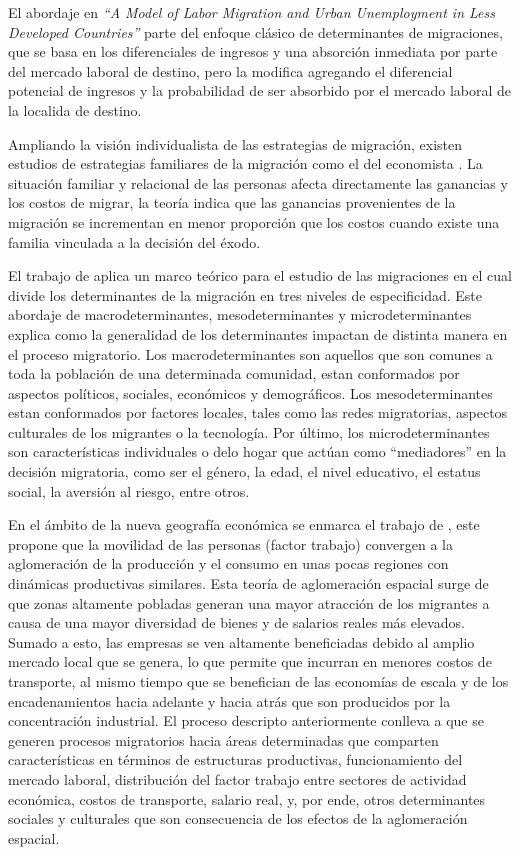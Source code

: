 \documentclass[12pt,a4paper]{article}
\begin{document}
El abordaje en \textit{``A Model of Labor Migration and Urban Unemployment in Less Developed Countries''} \parencite{todaro_model_1969} parte del enfoque clásico de determinantes de migraciones, que se basa en los diferenciales de ingresos y una absorción inmediata por parte del mercado laboral de destino, pero la modifica agregando el diferencial potencial de ingresos y la probabilidad de ser absorbido por el mercado laboral de la localida de destino. 

Ampliando la visión individualista de las estrategias de migración, existen estudios de estrategias familiares de la migración como el del economista \textcite{mincer_family_1978}. La situación familiar y relacional de las personas afecta directamente las ganancias y los costos de migrar, la teoría indica que las ganancias provenientes de la migración se incrementan en menor proporción que los costos cuando existe una familia vinculada a la decisión del éxodo. 

El trabajo de \textcite{kuhnt_literature_2019} aplica un marco teórico para el estudio de las migraciones en el cual divide los determinantes de la migración en tres niveles de especificidad. Este abordaje de macrodeterminantes, mesodeterminantes y microdeterminantes explica como la generalidad de los determinantes impactan de distinta manera en el proceso migratorio. Los macrodeterminantes son aquellos que son comunes a toda la población de una determinada comunidad, estan conformados por aspectos políticos, sociales, económicos y demográficos. Los mesodeterminantes estan conformados por factores locales, tales como las redes migratorias, aspectos culturales de los migrantes o la tecnología. Por último, los microdeterminantes son características individuales o delo hogar que actúan como ``mediadores'' en la decisión migratoria, como ser el género, la edad, el nivel educativo, el estatus social, la aversión al riesgo, entre otros. 

En el ámbito de la nueva geografía económica se enmarca el trabajo de \textcite{krugman_increasing_1991}, este  propone que la movilidad de las personas (factor trabajo) convergen a la aglomeración de la producción y el consumo en unas pocas regiones con dinámicas productivas similares. Esta teoría de aglomeración espacial surge de que  zonas altamente pobladas generan una mayor atracción de los migrantes a causa de una mayor diversidad de bienes y de salarios reales más elevados. Sumado a esto, las empresas se ven altamente beneficiadas debido al amplio mercado local que se genera, lo que permite que incurran en menores costos de transporte, al mismo tiempo que se benefician de las economías de escala y de los encadenamientos hacia adelante y hacia atrás que son producidos por la concentración industrial. El proceso descripto anteriormente conlleva a que se generen procesos migratorios hacia áreas determinadas que comparten características en términos de estructuras productivas, funcionamiento del mercado laboral, distribución del factor trabajo entre sectores de actividad económica, costos de transporte, salario real, y, por ende, otros determinantes sociales y culturales que son consecuencia de los efectos de la aglomeración espacial.
\end{document}
